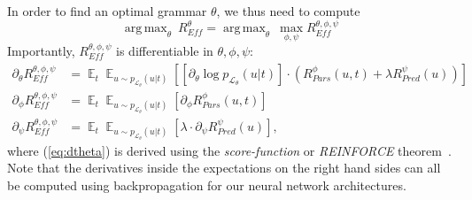 \documentclass[10pt,twoside,lineno]{article}
\DeclareMathOperator*{\argmax}{arg\,max}
\DeclareMathOperator{\E}{\mathop{\mathbb{E}}}
\begin{document}
%
%
In order to find an optimal grammar $\theta$, we thus need to compute 
\begin{equation}\label{eq:efficiency}
\argmax_\theta\	R_{\textit{Eff}}^{\theta} = \argmax_\theta\	\max_{\phi, \psi} R_{\textit{Eff}}^{\theta, \phi, \psi} 
\end{equation}
Importantly, $R_{\textit{Eff}}^{\theta, \phi, \psi}$ is differentiable in $\theta, \phi, \psi$: %
\begin{align}
\partial_\theta R_{\textit{Eff}}^{\theta, \phi, \psi} &= \E_t \E_{u \sim p_{\mathcal{L}_\theta}(u|t)} \left[  \left[\partial_\theta \log p_{\mathcal{L}_\theta}(u|t)\right] \cdot    \left(R_{Pars}^{\phi}(u,t) + \lambda R_{Pred}^{\psi}(u)\right) \right] \label{eq:dtheta}\\ 
\partial_\phi R_{\textit{Eff}}^{\theta, \phi, \psi} &= \E_t \E_{u \sim p_{\mathcal{L}_\theta}(u|t)}  \left[\partial_\phi R_{Pars}^{\phi}(u,t)\right] \\
\partial_\psi R_{\textit{Eff}}^{\theta, \phi, \psi} &= \E_t \E_{u \sim p_{\mathcal{L}_\theta}(u|t)}  \left[\lambda \cdot \partial_\psi R_{Pred}^{\psi}(u)\right] \label{eq:dpsi},
\end{align}
where (\ref{eq:dtheta}) is derived using the \emph{score-function} or \emph{REINFORCE} theorem~\cite{williams1992simple}.
Note that the derivatives inside the expectations on the right hand sides can all be computed using backpropagation for our neural network architectures.
\end{document}

